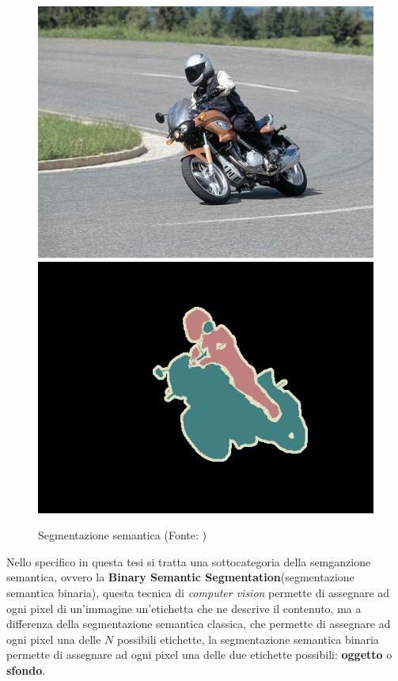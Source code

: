 \begin{figure}[!ht]
	\begin{adjustbox}{width=0.6\columnwidth, center}
		\includegraphics{./images/segmantion_example_image.png} \includegraphics{./images/segmantion_example_mask.png}
	\end{adjustbox}
	\caption{Segmentazione semantica (Fonte: \cite{pascal-voc-2012})}
	\label{fig:segmantion_example}
\end{figure}

Nello specifico in questa tesi si tratta una sottocategoria della semganzione semantica,
ovvero la \textbf{Binary Semantic Segmentation}(segmentazione semantica
binaria), questa tecnica di \textit{computer vision} permette di assegnare ad ogni pixel
di un'immagine un'etichetta che ne descrive il contenuto, ma a differenza della
segmentazione semantica classica, che permette di assegnare ad ogni pixel una delle $N$
possibili etichette, la segmentazione semantica binaria permette di assegnare ad ogni
pixel una delle due etichette possibili: \textbf{oggetto} o \textbf{sfondo}.

